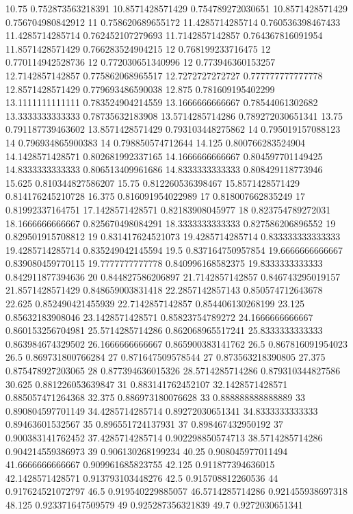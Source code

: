 {10.75 0.752873563218391
10.8571428571429 0.754789272030651
10.8571428571429 0.756704980842912
11 0.758620689655172
11.4285714285714 0.760536398467433
11.4285714285714 0.762452107279693
11.7142857142857 0.764367816091954
11.8571428571429 0.766283524904215
12 0.768199233716475
12 0.770114942528736
12 0.772030651340996
12 0.773946360153257
12.7142857142857 0.775862068965517
12.7272727272727 0.777777777777778
12.8571428571429 0.779693486590038
12.875 0.781609195402299
13.1111111111111 0.783524904214559
13.1666666666667 0.78544061302682
13.3333333333333 0.78735632183908
13.5714285714286 0.789272030651341
13.75 0.791187739463602
13.8571428571429 0.793103448275862
14 0.795019157088123
14 0.796934865900383
14 0.798850574712644
14.125 0.800766283524904
14.1428571428571 0.802681992337165
14.1666666666667 0.804597701149425
14.8333333333333 0.806513409961686
14.8333333333333 0.808429118773946
15.625 0.810344827586207
15.75 0.812260536398467
15.8571428571429 0.814176245210728
16.375 0.816091954022989
17 0.818007662835249
17 0.81992337164751
17.1428571428571 0.82183908045977
18 0.823754789272031
18.1666666666667 0.825670498084291
18.3333333333333 0.827586206896552
19 0.829501915708812
19 0.831417624521073
19.4285714285714 0.833333333333333
19.4285714285714 0.835249042145594
19.5 0.837164750957854
19.6666666666667 0.839080459770115
19.7777777777778 0.840996168582375
19.8333333333333 0.842911877394636
20 0.844827586206897
21.7142857142857 0.846743295019157
21.8571428571429 0.848659003831418
22.2857142857143 0.850574712643678
22.625 0.852490421455939
22.7142857142857 0.854406130268199
23.125 0.85632183908046
23.1428571428571 0.85823754789272
24.1666666666667 0.860153256704981
25.5714285714286 0.862068965517241
25.8333333333333 0.863984674329502
26.1666666666667 0.865900383141762
26.5 0.867816091954023
26.5 0.869731800766284
27 0.871647509578544
27 0.873563218390805
27.375 0.875478927203065
28 0.877394636015326
28.5714285714286 0.879310344827586
30.625 0.881226053639847
31 0.883141762452107
32.1428571428571 0.885057471264368
32.375 0.886973180076628
33 0.888888888888889
33 0.890804597701149
34.4285714285714 0.89272030651341
34.8333333333333 0.89463601532567
35 0.896551724137931
37 0.898467432950192
37 0.900383141762452
37.4285714285714 0.902298850574713
38.5714285714286 0.904214559386973
39 0.906130268199234
40.25 0.908045977011494
41.6666666666667 0.909961685823755
42.125 0.911877394636015
42.1428571428571 0.913793103448276
42.5 0.915708812260536
44 0.917624521072797
46.5 0.919540229885057
46.5714285714286 0.921455938697318
48.125 0.923371647509579
49 0.925287356321839
49.7 0.9272030651341
}
